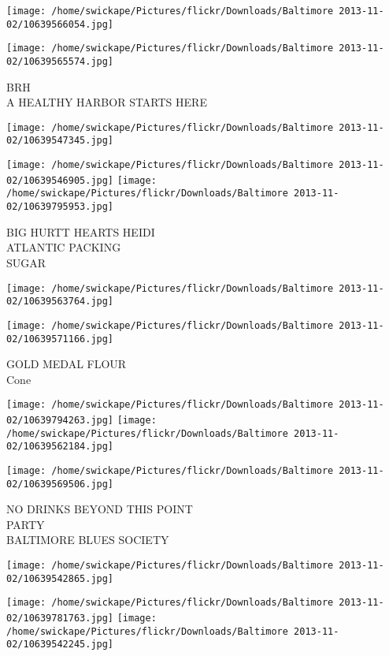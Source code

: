 \documentclass[10pt,letterpaper]{article}
\begin{document}
\texttt{[image: /home/swickape/Pictures/flickr/Downloads/Baltimore 2013-11-02/10639566054.jpg]}

\vspace{0.25in}
\texttt{[image: /home/swickape/Pictures/flickr/Downloads/Baltimore 2013-11-02/10639565574.jpg]}

BRH\\
A HEALTHY HARBOR STARTS HERE\\
\pagebreak

\texttt{[image: /home/swickape/Pictures/flickr/Downloads/Baltimore 2013-11-02/10639547345.jpg]}

\vspace{0.25in}
\texttt{[image: /home/swickape/Pictures/flickr/Downloads/Baltimore 2013-11-02/10639546905.jpg]}
\texttt{[image: /home/swickape/Pictures/flickr/Downloads/Baltimore 2013-11-02/10639795953.jpg]}

BIG HURTT HEARTS HEIDI\\
ATLANTIC PACKING\\
SUGAR\\
\pagebreak

\texttt{[image: /home/swickape/Pictures/flickr/Downloads/Baltimore 2013-11-02/10639563764.jpg]}

\vspace{0.25in}
\texttt{[image: /home/swickape/Pictures/flickr/Downloads/Baltimore 2013-11-02/10639571166.jpg]}

GOLD MEDAL FLOUR\\
Cone\\
\pagebreak

\texttt{[image: /home/swickape/Pictures/flickr/Downloads/Baltimore 2013-11-02/10639794263.jpg]}
\texttt{[image: /home/swickape/Pictures/flickr/Downloads/Baltimore 2013-11-02/10639562184.jpg]}

\texttt{[image: /home/swickape/Pictures/flickr/Downloads/Baltimore 2013-11-02/10639569506.jpg]}

NO DRINKS BEYOND THIS POINT\\
PARTY\\
BALTIMORE BLUES SOCIETY\\
\pagebreak

\texttt{[image: /home/swickape/Pictures/flickr/Downloads/Baltimore 2013-11-02/10639542865.jpg]}

\vspace{0.25in}
\texttt{[image: /home/swickape/Pictures/flickr/Downloads/Baltimore 2013-11-02/10639781763.jpg]}
\texttt{[image: /home/swickape/Pictures/flickr/Downloads/Baltimore 2013-11-02/10639542245.jpg]}
\end{document}
